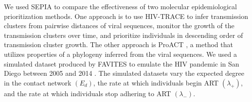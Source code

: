 \documentclass[twocolumn]{bmcart}%
\def\texttt{[image: ]}
\begin{document}
We used SEPIA to compare the effectiveness of two molecular epidemiological prioritization methods. One approach is to use HIV-TRACE to infer transmission clusters from pairwise distances of viral sequences, monitor the growth of the transmission clusters over time, and prioritize individuals in descending order of transmission cluster growth. The other approach is ProACT \cite{moshiri2019ProACT}, a method that utilizes properties of a phylogeny inferred from the viral sequences. We used a simulated dataset produced by FAVITES to emulate the HIV pandemic in San Diego between 2005 and 2014 \cite{moshiri2018favites}. The simulated datasets vary the expected degree in the contact network $\left(E_d\right)$, the rate at which individuals begin ART $\left(\lambda_+\right)$, and the rate at which individuals stop adhering to ART $\left(\lambda_-\right)$.





\end{document}
